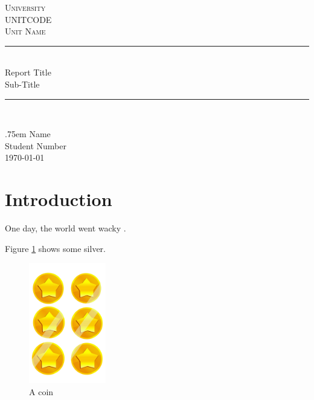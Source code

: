 \documentclass[a4paper,11pt]{article}
\begin{document}
\begin{titlepage}

    \centering

    \normalfont\normalsize
	\textsc{University}\\ %
  \textsc{UNITCODE}\\
  \textsc{Unit Name} \\
	\vspace{25pt} %
	\rule{\linewidth}{0.5pt}\\ %
	\vspace{20pt} %
    {\huge Report Title }\\
    \vspace{0.5em}
    {\large Sub-Title}
	\vspace{12pt} %
	\rule{\linewidth}{2pt}\\ %
    
	\vspace{0.1\textheight} %
 

    \normalsize \lineskip .75em
    \vspace{1em}
    \LARGE Name \\ \small Student Number  \\
 

    \vspace{0.1\textheight}
    \today

\end{titlepage}


\tableofcontents
\pagebreak
\listoffigures
\listoftables
\listoflistings


\pagebreak

\section{Introduction}
One day, the world went wacky \cite{suter2009day}. 

Figure \ref{fig:coin} shows some silver. 

\begin{figure}[h!]
    \center
    \includegraphics[width=0.3\textwidth]{resources/coin.png}
    \caption{A coin}
    \label{fig:coin}
\end{figure}
\end{document}
